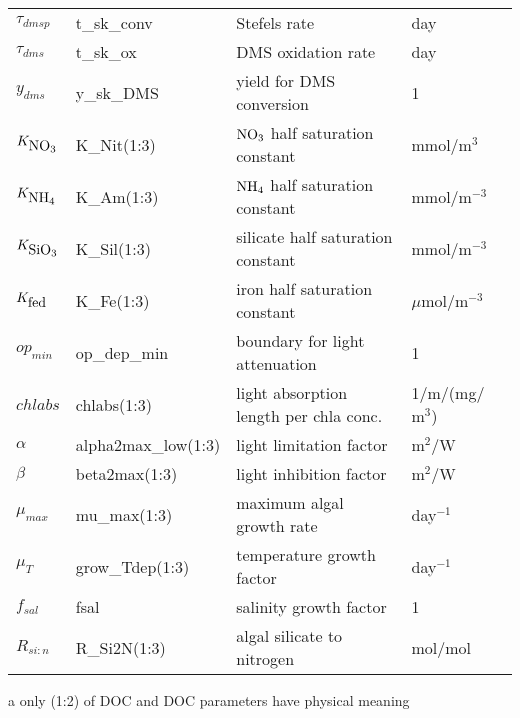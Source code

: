 \begin{table}[t!]
\begin{threeparttable}
\begin{tabular}{l|l|l|l|l}
$\tau_{dmsp}$ & t\_sk\_conv & Stefels rate & day \\
$\tau_{dms}$ & t\_sk\_ox & DMS oxidation rate  & day\\
$y_{dms}$ & y\_sk\_DMS & yield for DMS conversion & 1 \\
$K_{\mbox{NO$_3$}}$ & K\_Nit(1:3) & $\mbox{NO$_3$}$ half saturation constant  &
mmol/m$^{3}$\\
$K_{\mbox{NH$_4$}}$ & K\_Am(1:3) & $\mbox{NH$_4$}$ half saturation constant  & mmol/m$^{-3}$ \\
$K_{\mbox{SiO$_3$}}$ & K\_Sil(1:3) & silicate half saturation constant & mmol/m$^{-3}$  \\
$K_{\mbox{fed}}$ & K\_Fe(1:3) & iron half saturation constant  & $\mu$mol/m$^{-3}$ \\
$op_{min}$ & op\_dep\_min & boundary for light attenuation & 1\\
$chlabs$ & chlabs(1:3) & light absorption length per chla  conc.& 1$/$m$/$(mg$/$m$^{3}$) \\
$\alpha$ & alpha2max\_low(1:3) & light limitation factor & m$^2$/W \\
$\beta$ & beta2max(1:3) & light inhibition factor & m$^2$/W \\
$\mu_{max}$ & mu\_max(1:3) & maximum algal growth rate & day$^{-1}$ \\
$\mu_T$ & grow\_Tdep(1:3) & temperature growth factor & day$^{-1}$ \\
$f_{sal}$ & fsal & salinity  growth factor  & 1 \\
$R_{si:n}$ & R\_Si2N(1:3) & algal silicate to nitrogen &
mol/mol \\ \hline
\end{tabular}\label{table:bio_tracers2}
\begin{tablenotes}
\item[a] {only (1:2) of DOC and DOC parameters have physical meaning} \\
\end{tablenotes}
\end{threeparttable}
\end{table}

